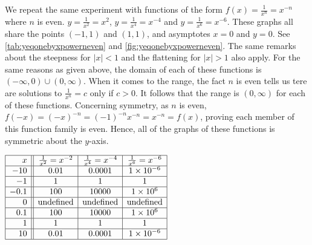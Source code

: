 We repeat the same experiment with functions of the form $f(x) = \frac{1}{x^{n}} = x^{-n}$ where $n$ is even. $y = \frac{1}{x^2} = x^2$, $y = \frac{1}{x^4} = x^{-4}$ and $y = \frac{1}{x^6} = x^{-6}$.  These graphs all share the points $(-1,1)$ and $(1,1)$, and asymptotes $x = 0$ and $y = 0$. See \autoref{tab:yeqonebyxpowerneven} and \autoref{fig:yeqonebyxpowerneven}. The same remarks about the steepness for $|x|<1$ and the flattening for $|x|>1$ also apply. For the same reasons as given above, the domain of each of these functions is $(-\infty, 0) \cup (0, \infty)$.  When it comes to the range, the fact $n$ is even tells us tere are  solutions to $\frac{1}{x^n} = c$ only if $c>0$. It follows that the range is $(0, \infty)$ for each of these functions.  Concerning symmetry, as $n$ is even, $f(-x) = (-x)^{-n} = (-1)^{-n} x^{-n} = x^{-n} = f(x)$, proving each member of this function family is even.  Hence, all of the graphs of these functions is symmetric about the $y$-axis.

\begin{itable}
  
$\begin{array}{|r||c|c|c|}  \hline

 x &  \frac{1}{x^2} = x^{-2} & \frac{1}{x^4} = x^{-4} & \frac{1}{x^6} = x^{-6} \\ \hline
 -10 &0.01 &0.0001& 1 \times 10^{-6}  \\  \hline
 -1 & 1 & 1&  1\\  \hline
 -0.1 & 100 & 10000 &  1 \times 10^{6} \\  \hline
 0 &  \text{undefined} &  \text{undefined}  &  \text{undefined}  \\  \hline
0.1 & 100 & 10000 &  1 \times 10^{6} \\  \hline
 1&  1 & 1&  1 \\  \hline
10 &0.01 &0.0001& 1 \times 10^{-6}  \\  \hline

\end{array}$

\caption{}
\label{tab:yeqonebyxpowerneven}
\end{itable}

